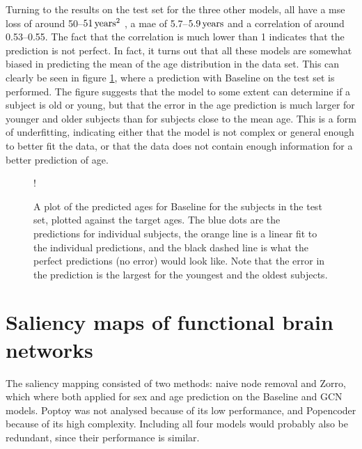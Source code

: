 Turning to the results on the test set for the three other models, all have a \acrshort{mse} loss of around 50--$51\rm\,years^2$ , a \acrshort{mae} of 5.7--$5.9\rm\,years$ and a correlation of around 0.53--0.55. The fact that the correlation is much lower than 1 indicates that the prediction is not perfect. In fact, it turns out that all these models are somewhat biased in predicting the mean of the age distribution in the data set. This can clearly be seen in figure \cref{fig:age_regression}, where a prediction with Baseline on the test set is performed. The figure suggests that the model to some extent can determine if a subject is old or young, but that the error in the age prediction is much larger for younger and older subjects than for subjects close to the mean age. This is a form of underfitting, indicating either that the model is not complex or general enough to better fit the data, or that the data does not contain enough information for a better prediction of age.

\begin{figure}[!htbp]
    \centering
    \begin{center}
        \resizebox {0.6\linewidth} {!} {
            
        }
    \end{center}
    \caption{A plot of the predicted ages for Baseline for the subjects in the test set, plotted against the target ages. The blue dots are the predictions for individual subjects, the orange line is a linear fit to the individual predictions, and the black dashed line is what the perfect predictions (no error) would look like. Note that the error in the prediction is the largest for the youngest and the oldest subjects.}
    \label{fig:age_regression}
\end{figure}

\section{Saliency maps of functional brain networks}
The saliency mapping consisted of two methods: naive node removal and Zorro, which where both applied for sex and age prediction on the Baseline and GCN models. Poptoy was not analysed because of its low performance, and Popencoder because of its high complexity. Including all four models would probably also be redundant, since their performance is similar. 

